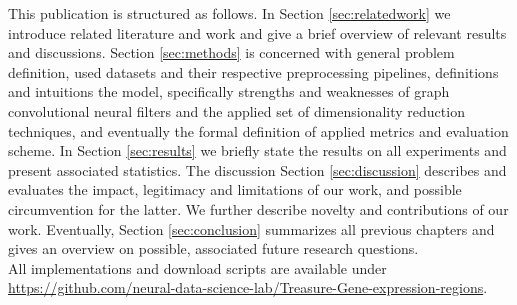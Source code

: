 \documentclass[]{article}
\newcommand{\Github}{https://github.com/neural-data-science-lab/Treasure-Gene-expression-regions}
\begin{document}
This publication is structured as follows. In Section \ref{sec:relatedwork} we introduce related literature and work and give a brief overview of relevant results and discussions. Section \ref{sec:methods} is concerned with general problem definition, used datasets and their respective preprocessing pipelines, definitions and intuitions the model, specifically strengths and weaknesses of graph convolutional neural filters and the applied set of dimensionality reduction techniques, and eventually the formal definition of applied metrics and evaluation scheme.
In Section \ref{sec:results} we briefly state the results on all experiments and present associated statistics. The discussion Section \ref{sec:discussion} describes and evaluates the impact, legitimacy and limitations of our work, and possible circumvention for the latter. We further describe novelty and contributions of our work. Eventually, Section \ref{sec:conclusion} summarizes all previous chapters and gives an overview on possible, associated future research questions.\\

All implementations and download scripts are available under \href{\Github}{\Github}.
\end{document}
